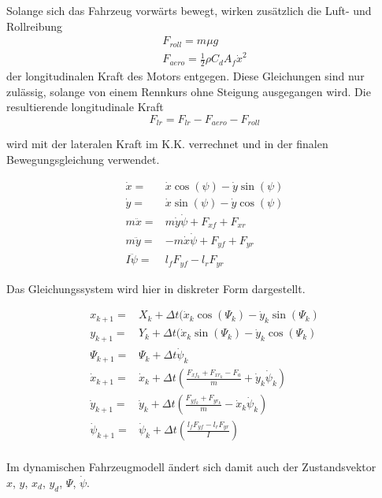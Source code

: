 \documentclass{like}
\begin{document}
Solange sich das Fahrzeug vorwärts bewegt, wirken zusätzlich die Luft- und Rollreibung 
\begin{eqnarray}
F_{roll} = m \mu g \\
F_{aero} = \frac{1}{2} \rho C_d A_f \dot{x}^2
\end{eqnarray}
der longitudinalen Kraft des Motors entgegen.
Diese Gleichungen sind nur zulässig, solange von einem Rennkurs ohne Steigung ausgegangen wird. Die resultierende longitudinale Kraft 
\begin{equation}
F_{lr} = F_{lr} - F_{aero} - F_{roll}
\end{equation}

wird mit der lateralen Kraft im \ac{K.K.} verrechnet und in der finalen Bewegungsgleichung verwendet.

\begin{eqnarray}
\dot{x} =& \dot{x} \cos(\psi) - \dot{y} \sin(\psi) \\
\dot{y} =& \dot{x} \sin(\psi) - \dot{y} \cos(\psi) \\
m \ddot{x} =& m \dot{y} \dot{\psi} + F_{xf} +  F_{xr}\\
m \ddot{y} =& - m \dot{x} \dot{\psi} +  F_{yf} +  F_{yr} \\
I \ddot{\psi} =&  l_f F_{yf} -  l_r F_{yr} 
\end{eqnarray}

Das Gleichungssystem wird hier in diskreter Form dargestellt.

\begin{eqnarray}
x_{k+1} =& X_k + \Delta t(\dot{x}_k \cos(\Psi_k) - \dot{y}_k \sin(\Psi_k) \\
y_{k+1} =& Y_{k} + \Delta t(\dot{x}_k \sin(\Psi_k) - \dot{y}_k \cos(\Psi_k) \\
\Psi_{k+1} =& \Psi_k + \Delta t \dot{\psi}_k \\
\dot{x}_{k+1} =&  \dot{x}_k + \Delta t \left(\frac{F_{xf_k} +  F_{xr_k}- F_a}{m} + \dot{y}_k \dot{\psi}_k \right) \\
\dot{y}_{k+1} =&  \dot{y}_k + \Delta t \left(\frac{ F_{yf_k} +  F_{yr_k}}{m} - \dot{x}_k \dot{\psi}_k \right)  \\
\dot{\psi}_{k+1} =& \dot{\psi}_k + \Delta t \left( \frac{ l_f F_{yf} -  l_r F_{yr}}{I}  \right)\\
\end{eqnarray}

Im dynamischen Fahrzeugmodell ändert sich damit auch der Zustandsvektor \\
\(x\), \(y\), \(x_d\), \(y_d\), \(\Psi\), \(\dot{\psi}\). \\
\end{document}
